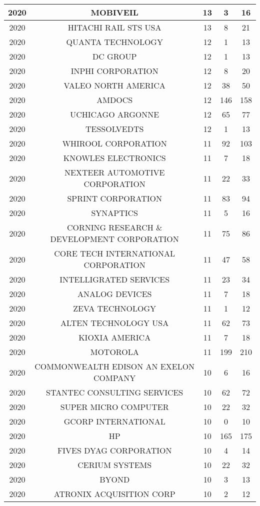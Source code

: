 \documentclass{article}%
\begin{document}
\begin{longtable}{c|c|c|c|c}
\hline%
2020&MOBIVEIL&13&3&16\\%
\hline%
2020&HITACHI RAIL STS USA&13&8&21\\%
\hline%
2020&QUANTA TECHNOLOGY&12&1&13\\%
\hline%
2020&DC GROUP&12&1&13\\%
\hline%
2020&INPHI CORPORATION&12&8&20\\%
\hline%
2020&VALEO NORTH AMERICA&12&38&50\\%
\hline%
2020&AMDOCS&12&146&158\\%
\hline%
2020&UCHICAGO ARGONNE&12&65&77\\%
\hline%
2020&TESSOLVEDTS&12&1&13\\%
\hline%
2020&WHIROOL CORPORATION&11&92&103\\%
\hline%
2020&KNOWLES ELECTRONICS&11&7&18\\%
\hline%
2020&NEXTEER AUTOMOTIVE CORPORATION&11&22&33\\%
\hline%
2020&SPRINT CORPORATION&11&83&94\\%
\hline%
2020&SYNAPTICS&11&5&16\\%
\hline%
2020&CORNING RESEARCH \& DEVELOPMENT CORPORATION&11&75&86\\%
\hline%
2020&CORE TECH INTERNATIONAL CORPORATION&11&47&58\\%
\hline%
2020&INTELLIGRATED SERVICES&11&23&34\\%
\hline%
2020&ANALOG DEVICES&11&7&18\\%
\hline%
2020&ZEVA TECHNOLOGY&11&1&12\\%
\hline%
2020&ALTEN TECHNOLOGY USA&11&62&73\\%
\hline%
2020&KIOXIA AMERICA&11&7&18\\%
\hline%
2020&MOTOROLA&11&199&210\\%
\hline%
2020&COMMONWEALTH EDISON AN EXELON COMPANY&10&6&16\\%
\hline%
2020&STANTEC CONSULTING SERVICES&10&62&72\\%
\hline%
2020&SUPER MICRO COMPUTER&10&22&32\\%
\hline%
2020&GCORP INTERNATIONAL&10&0&10\\%
\hline%
2020&HP&10&165&175\\%
\hline%
2020&FIVES DYAG CORPORATION&10&4&14\\%
\hline%
2020&CERIUM SYSTEMS&10&22&32\\%
\hline%
2020&BYOND&10&3&13\\%
\hline%
2020&ATRONIX ACQUISITION CORP&10&2&12\\%
\hline%

\end{longtable}
\end{document}
